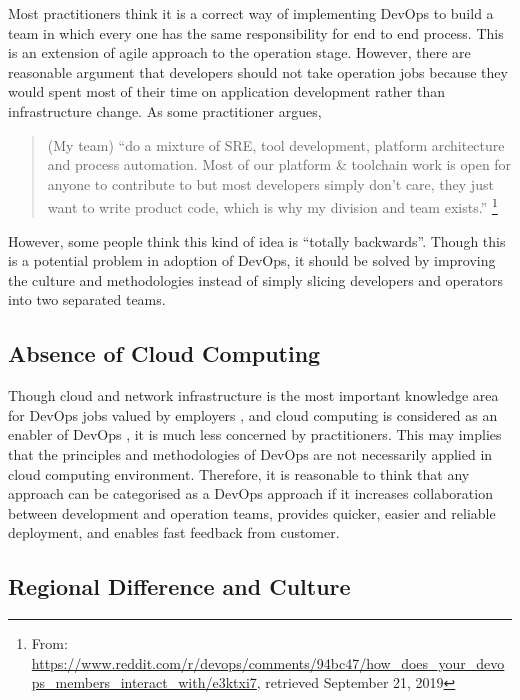 \documentclass[
  12pt,
  a4paper,
]{article}
\begin{document}
Most practitioners think it is a correct way of implementing DevOps to
build a team in which every one has the same responsibility for end to
end process. This is an extension of agile approach to the operation
stage. However, there are reasonable argument that developers should not
take operation jobs because they would spent most of their time on
application development rather than infrastructure change. As some
practitioner argues,

\begin{quote}
(My team) ``do a mixture of SRE, tool development, platform architecture
and process automation. Most of our platform \& toolchain work is open
for anyone to contribute to but most developers simply don't care, they
just want to write product code, which is why my division and team
exists.'' \footnote{From:
  \url{https://www.reddit.com/r/devops/comments/94bc47/how_does_your_devops_members_interact_with/e3ktxi7},
  retrieved September 21, 2019}
\end{quote}

However, some people think this kind of idea is ``totally backwards''.
Though this is a potential problem in adoption of DevOps, it should be
solved by improving the culture and methodologies instead of simply
slicing developers and operators into two separated teams.

\hypertarget{absence-of-cloud-computing}{%
\subsection{Absence of Cloud
Computing}\label{absence-of-cloud-computing}}

Though cloud and network infrastructure is the most important knowledge
area for DevOps jobs valued by employers \citep{hussain2017nz}, and
cloud computing is considered as an enabler of DevOps
\citep{Jabbari:2016:what-is-devops}, it is much less concerned by
practitioners. This may implies that the principles and methodologies of
DevOps are not necessarily applied in cloud computing environment.
Therefore, it is reasonable to think that any approach can be
categorised as a DevOps approach if it increases collaboration between
development and operation teams, provides quicker, easier and reliable
deployment, and enables fast feedback from customer.

\hypertarget{regional-difference-and-culture}{%
\subsection{Regional Difference and
Culture}\label{regional-difference-and-culture}}
\end{document}

